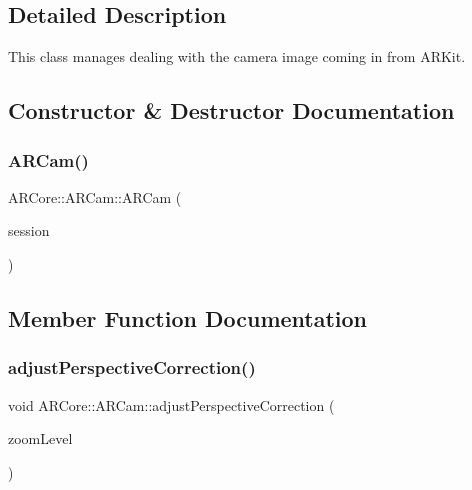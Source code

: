 \subsection{Detailed Description}
This class manages dealing with the camera image coming in from A\+R\+Kit. 

\subsection{Constructor \& Destructor Documentation}
\mbox{\label{class_a_r_core_1_1_a_r_cam_aac3da0758960b1cc5787eae0b7efffe1}} 
\subsubsection{\texorpdfstring{A\+R\+Cam()}{ARCam()}}
{\footnotesize\ttfamily A\+R\+Core\+::\+A\+R\+Cam\+::\+A\+R\+Cam (\begin{DoxyParamCaption}\item[{A\+R\+Session $\ast$}]{session }\end{DoxyParamCaption})}



\subsection{Member Function Documentation}
\mbox{\label{class_a_r_core_1_1_a_r_cam_ae2ecd3007e6684d1686c89d2ac3e7020}} 
\subsubsection{\texorpdfstring{adjust\+Perspective\+Correction()}{adjustPerspectiveCorrection()}}
{\footnotesize\ttfamily void A\+R\+Core\+::\+A\+R\+Cam\+::adjust\+Perspective\+Correction (\begin{DoxyParamCaption}\item[{float}]{zoom\+Level }\end{DoxyParamCaption})}




